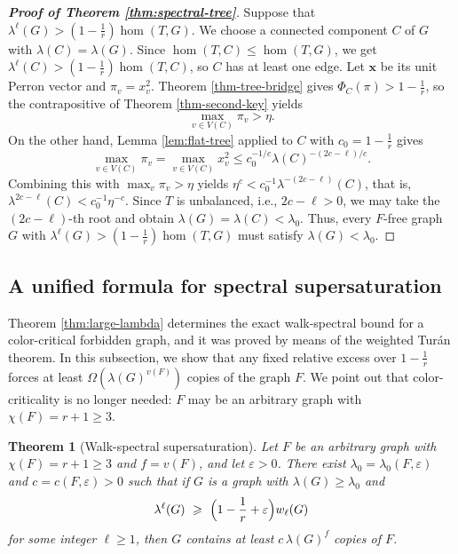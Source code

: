 \documentclass[11pt, a4paper]{article}
\newtheorem{theorem}{Theorem}[section]
\theoremstyle{definition}
\theoremstyle{plain}
\renewcommand{\le}{\leqslant}
\renewcommand{\ge}{\geqslant}
\begin{document}
\begin{proof}[{\bf Proof of Theorem \ref{thm:spectral-tree}}]
Suppose that $\lambda^\ell (G)>(1-\frac1r)\hom (T,G)$. We choose a connected component $C$ of $G$ with $\lambda (C)=\lambda (G)$.
Since $\hom (T,C)\le \hom (T,G)$, we get
$\lambda^\ell (C) >(1-\frac1r)\hom (T,C)$, so $C$ has at least one edge. Let $\bm{x}$ be its unit Perron vector and
$\pi_v=x_v^2$. Theorem \ref{thm-tree-bridge} gives
$\Phi_C(\pi)>1-\frac1r$, so the contrapositive of
Theorem \ref{thm-second-key} yields
$$\max_{v\in V(C) }\pi_v>\eta.$$
 On the other hand, Lemma \ref{lem:flat-tree}
applied to $C$ with $c_0=1-\frac1r$ gives
$$ \max_{v\in V(C)} \pi_v 
 = \max_{v\in V(C)}  x_v^2
 \le c_0^{-1/c}\lambda(C)^{-(2c-\ell)/c} .$$
Combining this with $\max_v \pi_v>\eta$ yields
$\eta^{c}<c_0^{-1}\lambda^{-(2c-\ell)}(C)$, that is,
$\lambda^{2c-\ell} (C)<c_0^{-1}\eta^{-c}$. Since $T$ is unbalanced, i.e., $2c-\ell >0$, we may take the $(2c-\ell)$-th root
and obtain $\lambda (G) = \lambda (C)<\lambda_0$. Thus, every $F$-free graph $G$ with $\lambda^\ell (G)>(1-\frac1r)\hom (T,G)$ must satisfy $\lambda (G) < \lambda_0$.
\end{proof}



\subsection{A unified formula for spectral supersaturation}
\label{subsec:supersat}


Theorem \ref{thm:large-lambda} determines the exact walk-spectral bound for a color-critical forbidden graph, and it was proved by means of the weighted Tur\'{a}n theorem. 
In this subsection, we show that
any fixed relative excess  over $1-\frac1r$ forces at least 
$ \Omega(\lambda (G)^{v(F)})$ copies of the graph $F$. 
We point out that color-criticality is no longer needed: $F$ may be an
arbitrary graph with $\chi (F)=r+1\ge 3$. 



\begin{theorem}[Walk-spectral supersaturation]
\label{thm:spectral-supersat}
Let $F$ be an arbitrary graph with $\chi (F)=r+1\ge 3$ and $f=v(F)$, and let $\varepsilon >0$. There exist $\lambda_0=\lambda_0(F,\varepsilon )$ and
$c=c(F,\varepsilon )>0$ such that if $G$ is a graph with
$\lambda (G)\ge \lambda_0$ and 
\[
  \lambda^{\ell}(G)\ \ge\ \Bigl(1-\frac1r+\varepsilon \Bigr)w_\ell (G)
\]
for some integer $\ell \ge 1$, then $G$ contains at least
$c\,\lambda (G)^{f}$ copies of $F$.
\end{theorem}
\end{document}

